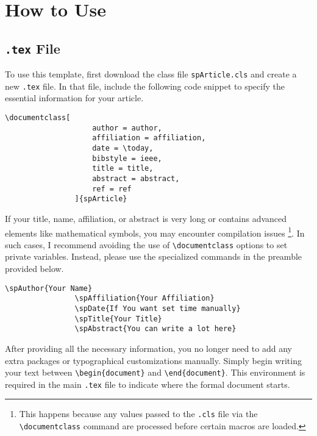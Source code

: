 \documentclass[
    bibstyle = apa,
]{spArticle}
\begin{document}
    \section{How to Use}
        \subsection{\texttt{.tex} File}
            To use this template, first download the class file \texttt{spArticle.cls} and create a new \texttt{.tex} file. In that file, include the following code snippet to specify the essential information for your article.
            \begin{Verbatim}[xleftmargin=-50pt]
                \documentclass[
                    author = author,
                    affiliation = affiliation,
                    date = \today,
                    bibstyle = ieee,
                    title = title,
                    abstract = abstract,
                    ref = ref
                ]{spArticle}
            \end{Verbatim}

            If your title, name, affiliation, or abstract is very long or contains advanced elements like mathematical symbols, you may encounter compilation issues \footnote{This happens because any values passed to the \texttt{.cls} file via the \texttt{\textbackslash documentclass} command are processed before certain macros are loaded.}. In such cases, I recommend avoiding the use of \texttt{\textbackslash documentclass} options to set private variables. Instead, please use the specialized commands in the preamble provided below.
            \begin{Verbatim}[xleftmargin=-70pt]
                \spAuthor{Your Name}
                \spAffiliation{Your Affiliation}
                \spDate{If You want set time manually}
                \spTitle{Your Title}
                \spAbstract{You can write a lot here}
            \end{Verbatim}

            After providing all the necessary information, you no longer need to add any extra packages or typographical customizations manually. Simply begin writing your text between \texttt{\textbackslash begin\{document\}} and \texttt{\textbackslash end\{document\}}. This environment is required in the main \texttt{.tex} file to indicate where the formal document starts.
\end{document}
